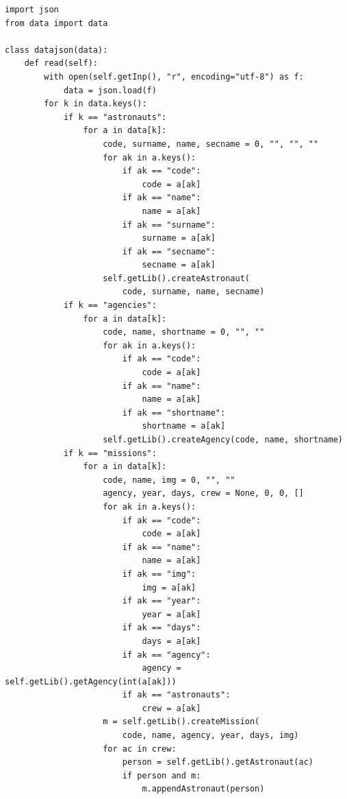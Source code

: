 \documentclass[a4paper,14pt]{extarticle}
\begin{document}
\begin{lstlisting}[caption={Модуль \texttt{datajson.py}: метод \texttt{read()}}]
import json
from data import data

class datajson(data):
    def read(self):
        with open(self.getInp(), "r", encoding="utf-8") as f:
            data = json.load(f)
        for k in data.keys():
            if k == "astronauts":
                for a in data[k]:
                    code, surname, name, secname = 0, "", "", ""
                    for ak in a.keys():
                        if ak == "code":
                            code = a[ak]
                        if ak == "name":
                            name = a[ak]
                        if ak == "surname":
                            surname = a[ak]
                        if ak == "secname":
                            secname = a[ak]
                    self.getLib().createAstronaut(
                        code, surname, name, secname)
            if k == "agencies":
                for a in data[k]:
                    code, name, shortname = 0, "", ""
                    for ak in a.keys():
                        if ak == "code":
                            code = a[ak]
                        if ak == "name":
                            name = a[ak]
                        if ak == "shortname":
                            shortname = a[ak]
                    self.getLib().createAgency(code, name, shortname)
            if k == "missions":
                for a in data[k]:
                    code, name, img = 0, "", ""
                    agency, year, days, crew = None, 0, 0, []
                    for ak in a.keys():
                        if ak == "code":
                            code = a[ak]
                        if ak == "name":
                            name = a[ak]
                        if ak == "img":
                            img = a[ak]
                        if ak == "year":
                            year = a[ak]
                        if ak == "days":
                            days = a[ak]
                        if ak == "agency":
                            agency = self.getLib().getAgency(int(a[ak]))
                        if ak == "astronauts":
                            crew = a[ak]
                    m = self.getLib().createMission(
                        code, name, agency, year, days, img)
                    for ac in crew:
                        person = self.getLib().getAstronaut(ac)
                        if person and m:
                            m.appendAstronaut(person)
\end{lstlisting}
\end{document}
